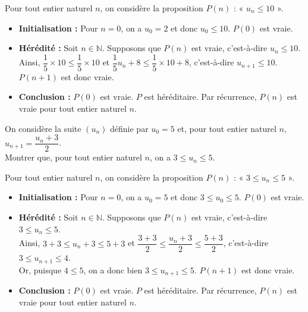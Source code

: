 \documentclass[11pt,fleqn]{book} %
\begin{document}
\begin{solution}Pour tout entier naturel $n$, on considère la proposition $P(n)$ : « $u_n\leqslant 10$ ».
\begin{itemize}
\item \textbf{Initialisation :} Pour $n=0$, on a $u_0=2$ et donc $u_0\leqslant 10$. $P(0)$ est vraie.
\item \textbf{Hérédité :} Soit $n\in\mathbb{N}$. Supposons que $P(n)$ est vraie, c'est-à-dire $u_n\leqslant 10$. Ainsi, $\dfrac{1}{5} \times 10 \leqslant \dfrac{1}{5} \times 10$ et $\dfrac{1}{5}u_n+8 \leqslant \dfrac{1}{5} \times 10 + 8$, c'est-à-dire $u_{n+1}\leqslant10$. $P(n+1)$ est donc vraie.
\item \textbf{Conclusion :} $P(0)$ est vraie. $P$ est héréditaire. Par récurrence, $P(n)$ est vraie pour tout entier naturel $n$.
\end{itemize}\end{solution}

\begin{exercise}[topic=rec02]On considère la suite $(u_n)$ définie par $u_0=5$ et, pour tout entier naturel $n$, $u_{n+1}=\dfrac{u_n+3}{2}$. \\ Montrer que, pour tout entier naturel $n$, on a $3 \leqslant u_n \leqslant 5$.\end{exercise}


\begin{solution}Pour tout entier naturel $n$, on considère la proposition $P(n)$ : « $3 \leqslant u_n \leqslant 5$ ».
\begin{itemize}
\item \textbf{Initialisation :} Pour $n=0$, on a $u_0=5$ et donc $3\leqslant u_0\leqslant 5$. $P(0)$ est vraie.
\item \textbf{Hérédité :} Soit $n\in\mathbb{N}$. Supposons que $P(n)$ est vraie, c'est-à-dire $3 \leqslant u_n \leqslant 5$. \\Ainsi, $3+3 \leqslant u_n+3 \leqslant 5+3$ et $\dfrac{3+3}{2} \leqslant \dfrac{u_n+3}{2} \leqslant \dfrac{5+3}{2}$, c'est-à-dire $3 \leqslant u_{n+1} \leqslant 4$.\\ Or, puisque $4 \leqslant 5$, on a donc bien $3\leqslant u_{n+1} \leqslant 5$. $P(n+1)$ est donc vraie.
\item \textbf{Conclusion :} $P(0)$ est vraie. $P$ est héréditaire. Par récurrence, $P(n)$ est vraie pour tout entier naturel $n$.
\end{itemize}\end{solution}
\end{document}
